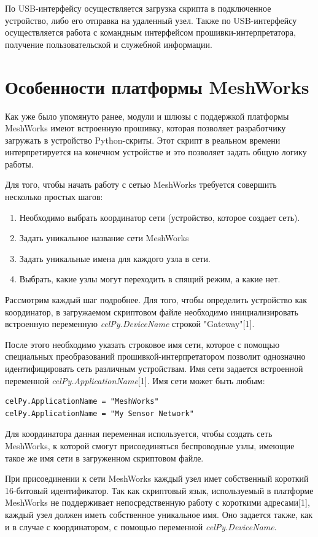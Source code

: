 \documentclass[11pt]{article}
\begin{document}
По USB-интерфейсу осуществляется загрузка скрипта в подключенное устройство, либо 
его отправка на удаленный узел. Также по USB-интерфейсу осуществляется работа с
командным интерфейсом прошивки-интерпретатора, получение пользовательской и служебной
информации.

\section{Особенности платформы MeshWorks}

Как уже было упомянуто ранее, модули и шлюзы с поддержкой платформы MeshWorks имеют
встроенную прошивку, которая позволяет разработчику загружать в устройство Python-скриты.
Этот скрипт в реальном времени интерпретируется на конечном устройстве и это позволяет
задать общую логику работы.

Для того, чтобы начать работу с сетью MeshWorks требуется совершить несколько простых шагов:
\begin{enumerate}
    \item Необходимо выбрать координатор сети (устройство, которое создает сеть).
    \item Задать уникальное название сети MeshWorks
    \item Задать уникальные имена для каждого узла в сети.
    \item Выбрать, какие узлы могут переходить в спящий режим, а какие нет.
\end{enumerate}

Рассмотрим каждый шаг подробнее. Для того, чтобы определить устройство как координатор,
в загружаемом скриптовом файле необходимо инициализировать встроенную переменную 
\emph{celPy.DeviceName} строкой "Gateway"[1].

После этого необходимо указать строковое имя сети, которое с помощью специальных 
преобразований прошивкой-интерпретатором позволит однозначно идентифицировать сеть 
различным устройствам. Имя сети задается встроенной переменной \emph{celPy.ApplicationName}[1].
Имя сети может быть любым:
\begin{verbatim}
celPy.ApplicationName = "MeshWorks"
celPy.ApplicationName = "My Sensor Network"
\end{verbatim}

Для координатора данная переменная используется, чтобы создать сеть MeshWorks, к
которой смогут присоединяться беспроводные узлы, имеющие такое же имя сети в загруженном
скриптовом файле.

При присоединении к сети MeshWorks каждый узел имет собственный короткий 16-битовый
идентификатор. Так как скриптовый язык, используемый в платформе MeshWorks не поддерживает
непосредственную работу с короткими адресами[1], каждый узел должен иметь собственное
уникальное имя. Оно задается также, как и в случае с координатором, с помощью переменной
\emph{celPy.DeviceName}.
\end{document}
